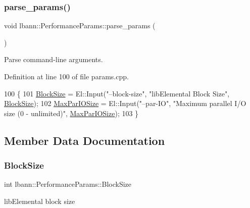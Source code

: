 \subsubsection{\texorpdfstring{parse\+\_\+params()}{parse\_params()}}
{\footnotesize\ttfamily void lbann\+::\+Performance\+Params\+::parse\+\_\+params (\begin{DoxyParamCaption}{ }\end{DoxyParamCaption})}



Parse command-\/line arguments. 



Definition at line 100 of file params.\+cpp.


\begin{DoxyCode}
100                                           \{
101   \hyperlink{classlbann_1_1PerformanceParams_af982cb94a2e7f01f45ff9ca80e9f8685}{BlockSize} = El::Input(\textcolor{stringliteral}{"--block-size"}, \textcolor{stringliteral}{"libElemental Block Size"}, 
      \hyperlink{classlbann_1_1PerformanceParams_af982cb94a2e7f01f45ff9ca80e9f8685}{BlockSize});
102   \hyperlink{classlbann_1_1PerformanceParams_a6869434b1b4ff69d91f2998f9d194a8f}{MaxParIOSize} = El::Input(\textcolor{stringliteral}{"--par-IO"}, \textcolor{stringliteral}{"Maximum parallel I/O size (0 - unlimited)"}, 
      \hyperlink{classlbann_1_1PerformanceParams_a6869434b1b4ff69d91f2998f9d194a8f}{MaxParIOSize});
103 \}
\end{DoxyCode}


\subsection{Member Data Documentation}
\mbox{\label{classlbann_1_1PerformanceParams_af982cb94a2e7f01f45ff9ca80e9f8685}} 
\subsubsection{\texorpdfstring{Block\+Size}{BlockSize}}
{\footnotesize\ttfamily int lbann\+::\+Performance\+Params\+::\+Block\+Size}



lib\+Elemental block size 



